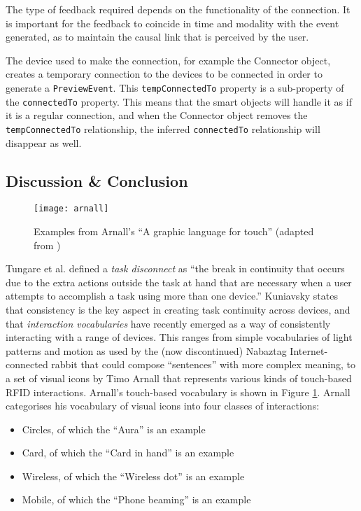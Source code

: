 The type of feedback required depends on the functionality of the connection. It is important for the feedback to coincide in time and modality with the event generated, as to maintain the causal link that is perceived by the user.

The device used to make the connection, for example the Connector object, creates a temporary connection to the devices to be connected in order to generate a \texttt{PreviewEvent}. This \texttt{tempConnectedTo} property is a sub-property of the \texttt{connectedTo} property. This means that the smart objects will handle it as if it is a regular connection, and when the Connector object removes the \texttt{tempConnectedTo} relationship, the inferred \texttt{connectedTo} relationship will disappear as well.


\subsection{Discussion \& Conclusion}

\begin{figure}[bth]
	\begin{center}
        \texttt{[image: arnall]}
	\end{center}
        \caption{Examples from Arnall's ``A graphic language for touch'' (adapted from \cite{Arnall2006})}
        \label{arnall}
\end{figure}

Tungare et al. \cite{Tungare2007} defined a \emph{task disconnect} as ``the break in continuity that occurs due to the extra actions outside the task at hand that are necessary when a user attempts to accomplish a task using more than one device.'' Kuniavsky \cite{Kuniavsky} states that consistency is the key aspect in creating task continuity across devices, and that \emph{interaction vocabularies} have recently emerged as a way of consistently interacting with a range of devices. This ranges from simple vocabularies of light patterns and motion as used by the (now discontinued) Nabaztag Internet-connected rabbit that could compose ``sentences'' with more complex meaning, to a set of visual icons by Timo Arnall \cite{Arnall2006} that represents various kinds of touch-based RFID interactions. Arnall's touch-based vocabulary is shown in Figure \ref{arnall}. Arnall categorises his vocabulary of visual icons into four classes of interactions: 

\begin{itemize}
	\item Circles, of which the ``Aura'' is an example
	\item Card, of which the ``Card in hand'' is an example
	\item Wireless, of which the ``Wireless dot'' is an example
	\item Mobile, of which the ``Phone beaming'' is an example
\end{itemize}


